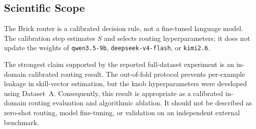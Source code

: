 \subsection{Scientific Scope}
\label{sec:brick-scientific-scope}

The Brick router is a calibrated decision rule, not a fine-tuned language
model. The calibration step estimates \(S\) and selects routing
hyperparameters; it does not update the weights of
\texttt{qwen3.5-9b}, \texttt{deepseek-v4-flash}, or \texttt{kimi2.6}.

The strongest claim supported by the reported full-dataset experiment is an
in-domain calibrated routing result. The out-of-fold protocol prevents
per-example leakage in skill-vector estimation, but the knob hyperparameters
were developed using Dataset~A. Consequently, this result is appropriate as a
calibrated in-domain routing evaluation and algorithmic ablation. It should not
be described as zero-shot routing, model fine-tuning, or validation on an
independent external benchmark.
